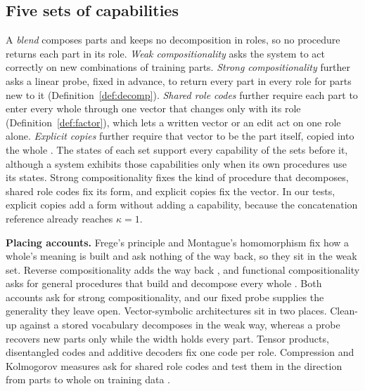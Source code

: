 \documentclass[10pt]{article}
\theoremstyle{plain}
\theoremstyle{remark}
\begin{document}
\subsection{Five sets of capabilities}
\label{sec:sets}

A \emph{blend} composes parts and keeps no decomposition in roles, so no procedure returns each part in its role. \emph{Weak compositionality} asks the system to act correctly on new combinations of training parts. \emph{Strong compositionality} further asks a linear probe, fixed in advance, to return every part in every role for parts new to it (Definition~\ref{def:decomp}). \emph{Shared role codes} further require each part to enter every whole through one vector that changes only with its role (Definition~\ref{def:factor}), which lets a written vector or an edit act on one role alone. \emph{Explicit copies} further require that vector to be the part itself, copied into the whole \citep{fodor1988}. The states of each set support every capability of the sets before it, although a system exhibits those capabilities only when its own procedures use its states. Strong compositionality fixes the kind of procedure that decomposes, shared role codes fix its form, and explicit copies fix the vector. In our tests, explicit copies add a form without adding a capability, because the concatenation reference already reaches $\kappa = 1$.

\textbf{Placing accounts.} Frege's principle and Montague's homomorphism fix how a whole's meaning is built and ask nothing of the way back, so they sit in the weak set. Reverse compositionality adds the way back \citep{fodor2002}, and functional compositionality asks for general procedures that build and decompose every whole \citep{vangelder1990}. Both accounts ask for strong compositionality, and our fixed probe supplies the generality they leave open. Vector-symbolic architectures sit in two places. Clean-up against a stored vocabulary decomposes in the weak way, whereas a probe recovers new parts only while the width holds every part. Tensor products, disentangled codes and additive decoders fix one code per role. Compression and Kolmogorov measures ask for shared role codes and test them in the direction from parts to whole on training data \citep{andreas2019,elmoznino2024,elmoznino2026}.
\end{document}

